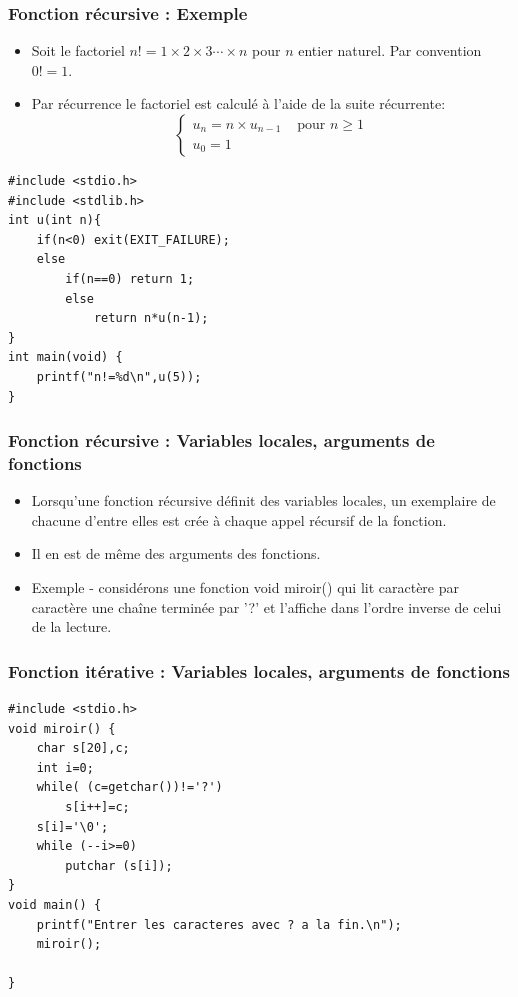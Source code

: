 \documentclass{beamer}
\begin{document}
\begin{frame}[fragile]
\frametitle{Fonction récursive : Exemple}
 
\begin{itemize}
\item Soit le factoriel $n!=1\times 2\times 3 \cdots \times n$ pour $n$ entier naturel. Par convention $0!=1$.
\item Par récurrence le factoriel est calculé à l'aide de la suite récurrente:
\[\left\{\begin{array}{ll}
u_n=n\times u_{n-1} & \mbox{ pour } n\geq 1\\
u_0 =1&
\end{array}\right.
\]
\end{itemize}
\begin{verbatim}
#include <stdio.h> 
#include <stdlib.h>
int u(int n){
    if(n<0) exit(EXIT_FAILURE);
    else
        if(n==0) return 1;
        else
            return n*u(n-1);
}
int main(void) {
    printf("n!=%d\n",u(5));	
}
\end{verbatim}

\end{frame}

\begin{frame}[fragile]
\frametitle{Fonction récursive : Variables locales, arguments de fonctions}
 
\begin{itemize}
\item Lorsqu'une fonction récursive définit des variables locales, un exemplaire de chacune d'entre elles est crée à chaque appel récursif de la fonction. 
\item Il en est de même des arguments des fonctions.
\item Exemple - considérons une fonction void miroir() qui lit caractère par caractère une chaîne terminée par '?' et l'affiche dans l'ordre inverse de celui de la lecture.
\end{itemize}


\end{frame}


\begin{frame}[fragile]
\frametitle{Fonction itérative : Variables locales, arguments de fonctions}
 
\begin{verbatim}
#include <stdio.h> 
void miroir() { 
    char s[20],c; 
    int i=0; 
    while( (c=getchar())!='?') 
        s[i++]=c; 
    s[i]='\0'; 
    while (--i>=0) 
        putchar (s[i]); 
}
void main() { 
    printf("Entrer les caracteres avec ? a la fin.\n"); 
    miroir(); 
    
}

\end{verbatim}

\end{frame}
\end{document}
